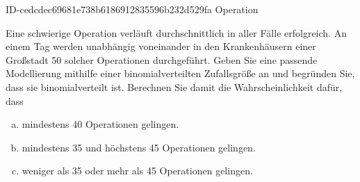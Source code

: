 \begin{exercise}
      {ID-cedcdec69681e738b6186912835596b232d529fa}
      {Operation}
  \ifproblem\problem\par
    Eine schwierige Operation verläuft durchschnittlich in  aller
    Fälle erfolgreich. An einem Tag werden unabhängig voneinander in den
    Krankenhäusern einer Großstadt 50 solcher Operationen durchgeführt.
    Geben Sie eine passende Modellierung mithilfe einer binomialverteilten
    Zufallsgröße an und begründen Sie, dass sie binomialverteilt ist.
    Berechnen Sie damit die Wahrscheinlichkeit dafür, dass
    \begin{enumerate}[a)]
      \item mindestens 40 Operationen gelingen.
      \item mindestens 35 und höchstens 45 Operationen gelingen.
      \item weniger als 35 oder mehr als 45 Operationen gelingen.
    \end{enumerate}
  \fi
\end{exercise}
